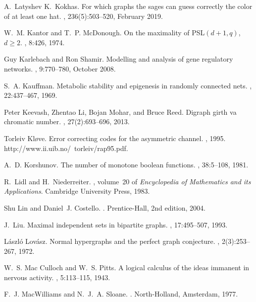 \documentclass[a4paper, 11pt]{book}
\numberwithin{equation}{section}
\theoremstyle{plain}
\renewcommand{\(}{\ldbrack}
\renewcommand{\)}{\rdbrack}
\begin{document}
\begin{thebibliography}{100}
A.~Latyshev K.~Kokhas.
\newblock For which graphs the sages can guess correctly the color of at least
  one hat.
, 236(5):503--520, February
  2019.

W.~M. Kantor and T.~P. McDonough.
\newblock On the maximality of {PSL}$(d+1,q)$, $d \ge 2$.
, 8:426, 1974.

Guy Karlebach and Ron Shamir.
\newblock Modelling and analysis of gene regulatory networks.
, 9:770--780, October 2008.

S.~A. Kauffman.
\newblock Metabolic stability and epigenesis in randomly connected nets.
, 22:437--467, 1969.

Peter Keevash, Zhentao Li, Bojan Mohar, and Bruce Reed.
\newblock Digraph girth va chromatic number.
, 27(2):693--696, 2013.

Torleiv Kl\o{}ve.
\newblock Error correcting codes for the asymmetric channel.
, 1995.
\newblock http://www.ii.uib.no/~torleiv/rap95.pdf.

A.~D. Korshunov.
\newblock The number of monotone boolean functions.
, 38:5--108, 1981.

R.~Lidl and H.~Niederreiter.
, volume~20 of {\em Encyclopedia of Mathematics
  and its Applications}.
\newblock Cambridge University Press, 1983.

Shu Lin and Daniel~J. Costello.
.
\newblock Prentice-Hall, 2nd edition, 2004.

J.~Liu.
\newblock Maximal independent sets in bipartite graphs.
, 17:495--507, 1993.

L{\'a}szl{\'o} Lov{\'a}sz.
\newblock Normal hypergraphs and the perfect graph conjecture.
, 2(3):253--267, 1972.

W.~S. {Mac Culloch} and W.~S. Pitts.
\newblock A logical calculus of the ideas immanent in nervous activity.
, 5:113--115, 1943.

F.~J. MacWilliams and N.~J.~A. Sloane.
.
\newblock North-Holland, Amsterdam, 1977.


\end{thebibliography}
\end{document}
